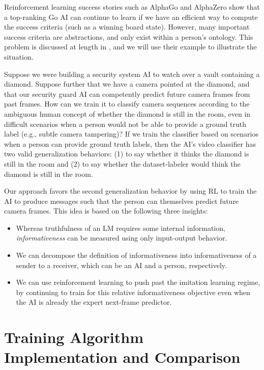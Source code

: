 \documentclass{article}
\begin{document}
Reinforcement learning success stories such as AlphaGo \citep{Silver2016} and AlphaZero \citep{Silver2017} show that a top-ranking Go AI can continue to learn if we have an efficient way to compute the success criteria (such as a winning board state). However, many important success criteria are abstractions, and only exist within a person's ontology. This problem is discussed at length in \citet{christiano2021eliciting}, and we will use their example to illustrate the situation. 

Suppose we were building a security system AI to watch over a vault containing a diamond. Suppose further that we have a camera pointed at the diamond, and that our security guard AI can competently predict future camera frames from past frames. How can we train it to classify camera sequences according to the ambiguous human concept of whether the diamond is still in the room, even in difficult scenarios when a person would not be able to provide a ground truth label (e.g., subtle camera tampering)? If we train the classifier based on scenarios when a person can provide ground truth labels, then the AI's video classifier has two valid generalization behaviors: (1) to say whether it thinks the diamond is still in the room and (2) to say whether the dataset-labeler would think the diamond is still in the room. 

Our approach favors the second generalization behavior by using RL to train the AI to produce messages such that the person can themselves predict future camera frames.
This idea is based on the following three insights:
\begin{itemize}
\item Whereas truthfulness of an LM requires some internal information, \emph{informativeness} can be measured using only input-output behavior.
\item We can decompose the definition of informativeness into informativeness of a sender to a receiver, which can be an AI and a person, respectively.
\item We can use reinforcement learning to push past the imitation learning regime, by continuing to train for this relative informativeness objective even when the AI is already the expert next-frame predictor.
\end{itemize}

\section{Training Algorithm Implementation and Comparison}
\label{app:training_algorithms}
\end{document}
